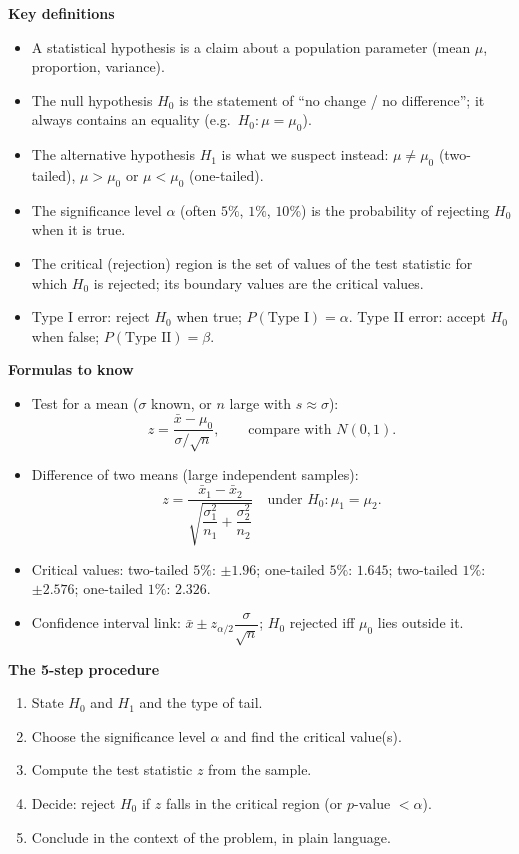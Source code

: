 \documentclass[11pt]{article}
\newcommand{\cle}[1]{{\popxbold\color{popdark}#1}}
\begin{document}
\begin{bilan}
\textbf{Key definitions}
\begin{itemize}
\item A \cle{statistical hypothesis} is a claim about a population parameter (mean $\mu$, proportion, variance).
\item The \cle{null hypothesis} $H_0$ is the statement of ``no change / no difference''; it always contains an equality (e.g.\ $H_0:\mu=\mu_0$).
\item The \cle{alternative hypothesis} $H_1$ is what we suspect instead: $\mu\neq\mu_0$ (two-tailed), $\mu>\mu_0$ or $\mu<\mu_0$ (one-tailed).
\item The \cle{significance level} $\alpha$ (often $5\%$, $1\%$, $10\%$) is the probability of rejecting $H_0$ when it is true.
\item The \cle{critical (rejection) region} is the set of values of the test statistic for which $H_0$ is rejected; its boundary values are the \cle{critical values}.
\item \cle{Type I error}: reject $H_0$ when true; $P(\text{Type I})=\alpha$. \cle{Type II error}: accept $H_0$ when false; $P(\text{Type II})=\beta$.
\end{itemize}

\textbf{Formulas to know}
\begin{itemize}
\item Test for a mean ($\sigma$ known, or $n$ large with $s\approx\sigma$):
\[ z=\frac{\bar{x}-\mu_0}{\sigma/\sqrt{n}},\qquad \text{compare with } N(0,1). \]
\item Difference of two means (large independent samples):
\[ z=\frac{\bar{x}_1-\bar{x}_2}{\sqrt{\dfrac{\sigma_1^{2}}{n_1}+\dfrac{\sigma_2^{2}}{n_2}}}\quad\text{under }H_0:\mu_1=\mu_2. \]
\item Critical values: two-tailed $5\%$: $\pm1.96$; one-tailed $5\%$: $1.645$; two-tailed $1\%$: $\pm2.576$; one-tailed $1\%$: $2.326$.
\item Confidence interval link: $\bar{x}\pm z_{\alpha/2}\dfrac{\sigma}{\sqrt{n}}$; $H_0$ rejected iff $\mu_0$ lies outside it.
\end{itemize}

\textbf{The 5-step procedure}
\begin{enumerate}
\item State $H_0$ and $H_1$ and the type of tail.
\item Choose the significance level $\alpha$ and find the critical value(s).
\item Compute the test statistic $z$ from the sample.
\item Decide: reject $H_0$ if $z$ falls in the critical region (or $p$-value $<\alpha$).
\item Conclude in the context of the problem, in plain language.
\end{enumerate}


\end{bilan}
\end{document}
